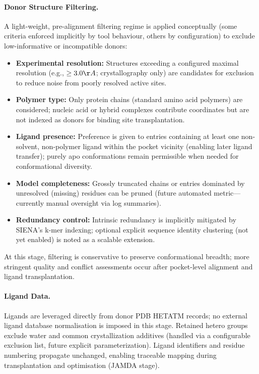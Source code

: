 \paragraph{Donor Structure Filtering.} A light-weight, pre-alignment filtering regime is applied conceptually (some criteria enforced implicitly by tool behaviour, others by configuration) to exclude low-informative or incompatible donors:
\begin{itemize}
    \item \textbf{Experimental resolution:} Structures exceeding a configured maximal resolution (e.g., \(\ge 3.0 \AA\); crystallography only) are candidates for exclusion to reduce noise from poorly resolved active sites.
    \item \textbf{Polymer type:} Only protein chains (standard amino acid polymers) are considered; nucleic acid or hybrid complexes contribute coordinates but are not indexed as donors for binding site transplantation.
    \item \textbf{Ligand presence:} Preference is given to entries containing at least one non-solvent, non-polymer ligand within the pocket vicinity (enabling later ligand transfer); purely apo conformations remain permissible when needed for conformational diversity.
    \item \textbf{Model completeness:} Grossly truncated chains or entries dominated by unresolved (missing) residues can be pruned (future automated metric—currently manual oversight via log summaries).
    \item \textbf{Redundancy control:} Intrinsic redundancy is implicitly mitigated by SIENA's k-mer indexing; optional explicit sequence identity clustering (not yet enabled) is noted as a scalable extension.
\end{itemize}
At this stage, filtering is conservative to preserve conformational breadth; more stringent quality and conflict assessments occur after pocket-level alignment and ligand transplantation.

\paragraph{Ligand Data.} Ligands are leveraged directly from donor PDB HETATM records; no external ligand database normalisation is imposed in this stage. Retained hetero groups exclude water and common crystallization additives (handled via a configurable exclusion list, future explicit parameterization). Ligand identifiers and residue numbering propagate unchanged, enabling traceable mapping during transplantation and optimisation (JAMDA stage).

